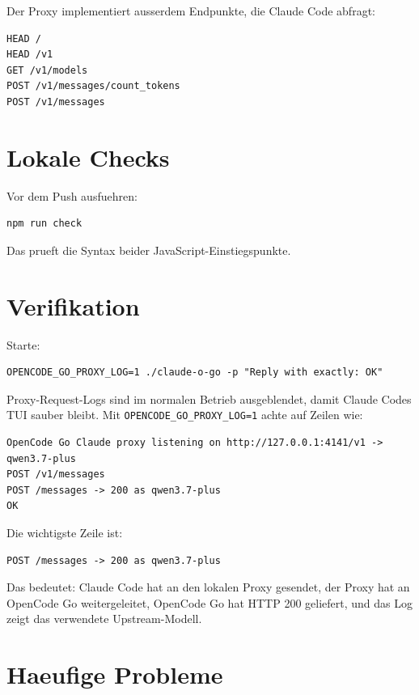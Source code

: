 \documentclass[11pt,a4paper]{article}
\newcommand{\code}[1]{\texttt{#1}}
\begin{document}
Der Proxy implementiert ausserdem Endpunkte, die Claude Code abfragt:

\begin{verbatim}
HEAD /
HEAD /v1
GET /v1/models
POST /v1/messages/count_tokens
POST /v1/messages
\end{verbatim}

\section{Lokale Checks}

Vor dem Push ausfuehren:

\begin{verbatim}
npm run check
\end{verbatim}

Das prueft die Syntax beider JavaScript-Einstiegspunkte.

\section{Verifikation}

Starte:

\begin{verbatim}
OPENCODE_GO_PROXY_LOG=1 ./claude-o-go -p "Reply with exactly: OK"
\end{verbatim}

Proxy-Request-Logs sind im normalen Betrieb ausgeblendet, damit Claude Codes
TUI sauber bleibt. Mit \code{OPENCODE\_GO\_PROXY\_LOG=1} achte auf Zeilen wie:

\begin{verbatim}
OpenCode Go Claude proxy listening on http://127.0.0.1:4141/v1 -> qwen3.7-plus
POST /v1/messages
POST /messages -> 200 as qwen3.7-plus
OK
\end{verbatim}

Die wichtigste Zeile ist:

\begin{verbatim}
POST /messages -> 200 as qwen3.7-plus
\end{verbatim}

Das bedeutet: Claude Code hat an den lokalen Proxy gesendet, der Proxy hat an
OpenCode Go weitergeleitet, OpenCode Go hat HTTP 200 geliefert, und das Log
zeigt das verwendete Upstream-Modell.

\section{Haeufige Probleme}
\end{document}
